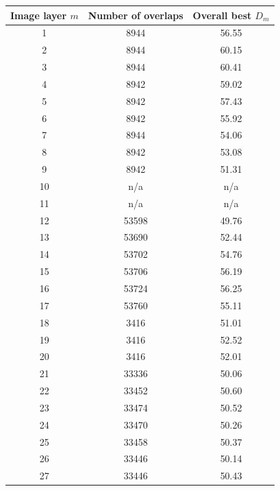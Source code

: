 \documentclass[letterpaper,11pt]{article}
\begin{document}
\begin{table}[!htb]
\centering
\begin{tabular}{c c c}
Image layer $m$ & Number of overlaps & Overall best $D_{m}$ \\
\hline
1               & 8944               & 56.55 \\
2               & 8944               & 60.15 \\
3               & 8944               & 60.41 \\
4               & 8942               & 59.02 \\
5               & 8942               & 57.43 \\
6               & 8942               & 55.92 \\
7               & 8944               & 54.06 \\
8               & 8942               & 53.08 \\
9               & 8942               & 51.31 \\
10              & n/a                & n/a   \\
11              & n/a                & n/a   \\
12              & 53598              & 49.76 \\
13              & 53690              & 52.44 \\
14              & 53702              & 54.76 \\
15              & 53706              & 56.19 \\
16              & 53724              & 56.25 \\
17              & 53760              & 55.11 \\
18              & 3416               & 51.01 \\
19              & 3416               & 52.52 \\
20              & 3416               & 52.01 \\
21              & 33336              & 50.06 \\
22              & 33452              & 50.60 \\
23              & 33474              & 50.52 \\
24              & 33470              & 50.26 \\
25              & 33458              & 50.37 \\
26              & 33446              & 50.14 \\
27              & 33446              & 50.43 \\

\end{tabular}
\end{table}
\end{document}
